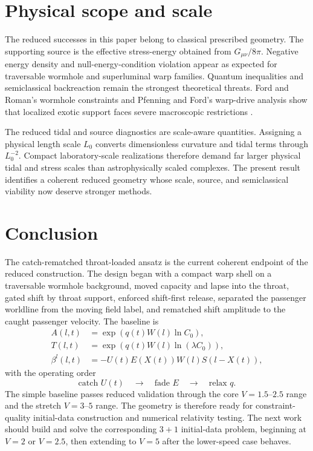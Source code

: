 \documentclass[11pt]{article}
\begin{document}
\section{Physical scope and scale}
The reduced successes in this paper belong to classical prescribed geometry.  The supporting source is the effective stress-energy obtained from $G_{\mu\nu}/8\pi$.  Negative energy density and null-energy-condition violation appear as expected for traversable wormhole and superluminal warp families.  Quantum inequalities and semiclassical backreaction remain the strongest theoretical threats.  Ford and Roman's wormhole constraints and Pfenning and Ford's warp-drive analysis show that localized exotic support faces severe macroscopic restrictions \citep{ford_roman_1996,pfenning_ford_1997}.

The reduced tidal and source diagnostics are scale-aware quantities.  Assigning a physical length scale $L_0$ converts dimensionless curvature and tidal terms through $L_0^{-2}$.  Compact laboratory-scale realizations therefore demand far larger physical tidal and stress scales than astrophysically scaled complexes.  The present result identifies a coherent reduced geometry whose scale, source, and semiclassical viability now deserve stronger methods.

\section{Conclusion}
The catch-rematched throat-loaded ansatz is the current coherent endpoint of the reduced construction.  The design began with a compact warp shell on a traversable wormhole background, moved capacity and lapse into the throat, gated shift by throat support, enforced shift-first release, separated the passenger worldline from the moving field label, and rematched shift amplitude to the caught passenger velocity.  The baseline is
\begin{align}
 A(l,t)&=\exp\!\left(q(t)W(l)\ln C_0\right),\nonumber\\
 T(l,t)&=\exp\!\left(q(t)W(l)\ln(\lambda C_0)\right),\nonumber\\
 \beta^l(l,t)&=-U(t)E(X(t))W(l)S(l-X(t)),\nonumber
\end{align}
with the operating order
\begin{equation}
 \text{catch }U(t)\quad\rightarrow\quad\text{fade }E\quad\rightarrow\quad\text{relax }q.
\end{equation}
The simple baseline passes reduced validation through the core $V=1.5$--$2.5$ range and the stretch $V=3$--$5$ range.  The geometry is therefore ready for constraint-quality initial-data construction and numerical relativity testing.  The next work should build and solve the corresponding $3+1$ initial-data problem, beginning at $V=2$ or $V=2.5$, then extending to $V=5$ after the lower-speed case behaves.
\end{document}
